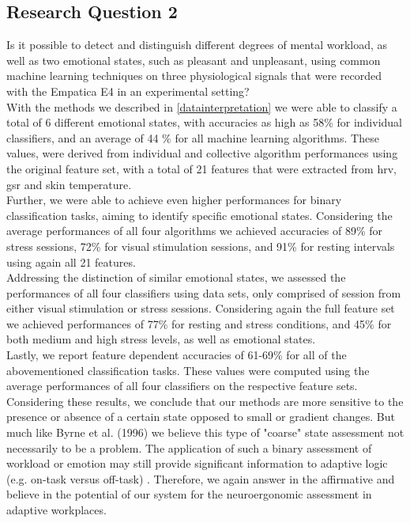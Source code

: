 \subsection{Research Question 2}  
Is it possible to detect and distinguish different degrees of mental workload, as well as two emotional states, such as pleasant and unpleasant, using common machine learning techniques on three physiological signals that were recorded with the Empatica E4 in an experimental setting?\\[10pt]
With the methods we described in \ref{datainterpretation} we were able to classify a total of 6 different emotional states, with accuracies as high as 58\% for individual classifiers, and an average of 44 \% for all machine learning algorithms. These values, were derived from individual and collective algorithm performances using the original feature set, with a total of 21 features that were extracted from \gls{hrv}, \gls{gsr} and skin temperature.\\
Further, we were able to achieve even higher performances for binary classification tasks, aiming to identify specific emotional states. Considering the average performances of all four algorithms we achieved accuracies of 89\% for stress sessions, 72\% for visual stimulation sessions, and 91\% for resting intervals using again all 21 features.\\
Addressing the distinction of similar emotional states, we assessed the performances of all four classifiers using data sets, only comprised of session from either visual stimulation or stress sessions. Considering again the full feature set we achieved performances of 77\% for resting and stress conditions, and 45\% for both medium and high stress levels, as well as emotional states.\\
Lastly, we report feature dependent accuracies of 61-69\% for all of the abovementioned classification tasks. These values were computed using the average performances of all four classifiers on the respective feature sets.\\
Considering these results, we conclude that our methods are more sensitive to the presence or absence of a certain state opposed to small or gradient changes. But much like Byrne et al. (1996) we believe this type of "coarse" state assessment not necessarily to be a problem. The application of such a binary assessment of workload or emotion may still provide significant information to adaptive logic (e.g. on-task versus off-task) \cite{Byrne1996}. Therefore, we again answer in the affirmative and believe in the potential of our system for the neuroergonomic assessment in adaptive workplaces. 

